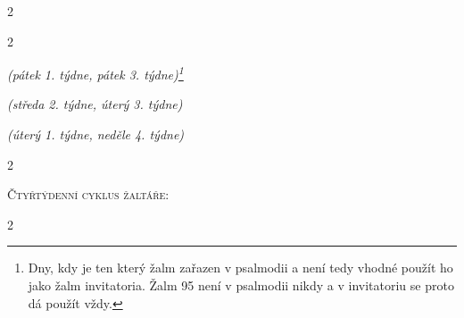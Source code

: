 \documentclass[a5paper, twoside]{article}
\newenvironment{hora}{
  \begin{multicols}{2}
}{
  \end{multicols}
}
\newcommand{\poznamkaPod}[1]{
  \hfill {\footnotesize \noindent \textit{#1}}}
\begin{document}
\begin{hora}
\label{benedictus}

\columnbreak
\label{magnificat}


\end{hora}

\vfill
\pagebreak


\begin{hora}
\label{zalm95}




\poznamkaPod{(pátek 1. týdne, pátek 3. týdne)\footnote{
Dny, kdy je ten který žalm zařazen v psalmodii a není tedy vhodné použít ho
jako žalm invitatoria. Žalm 95 není v psalmodii nikdy a v invitatoriu se proto
dá použít vždy.}}



\poznamkaPod{(středa 2. týdne, úterý 3. týdne)}

\label{z24}


\poznamkaPod{(úterý 1. týdne, neděle 4. týdne)}

\end{hora}

\pagebreak


\begin{hora}



\end{hora}

\clearpage

\begin{center}
{\LARGE \textsc{Čtyřtýdenní cyklus žaltáře:}}
\end{center}



\nesporyI
\begin{hora}


\label{kantfp2}

\end{hora}
\end{document}
